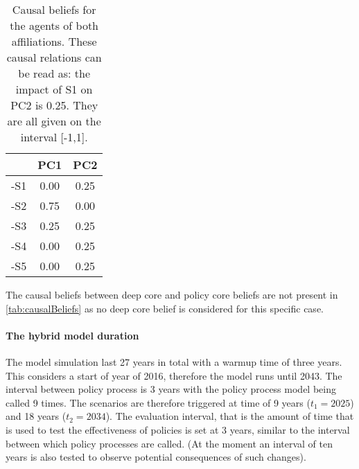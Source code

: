 \begin{table}
\begin{center}
\begin{tabular}{ |c|c|c|}
 \hline
 	& PC1	& PC2		\\ \hline \hline
-S1 	& 0.00	& 0.25		\\ \hline
-S2 	& 0.75	& 0.00		\\ \hline
-S3 	& 0.25	& 0.25		\\ \hline
-S4 	& 0.00	& 0.25		\\ \hline
-S5 	& 0.00	& 0.25		\\ 
 \hline
\end{tabular}
\end{center}
\caption{Causal beliefs for the agents of both affiliations. These causal relations can be read as: the impact of S1 on PC2 is 0.25. They are all given on the interval [-1,1].}
\label{tab:causalBeliefs}
\end{table}

The causal beliefs between deep core and policy core beliefs are not present in \autoref{tab:causalBeliefs} as no deep core belief is considered for this specific case.


\paragraph{The hybrid model duration}

The model simulation last 27 years in total with a warmup time of three years. This considers a start of year of 2016, therefore the model runs until 2043. The interval between policy process is 3 years with the policy process model being called 9 times. The scenarios are therefore triggered at time of 9 years ($t_1 = 2025$) and 18 years ($t_2 = 2034$). The evaluation interval, that is the amount of time that is used to test the effectiveness of policies is set at 3 years, similar to the interval between which policy processes are called. (At the moment an interval of ten years is also tested to observe potential consequences of such changes).




